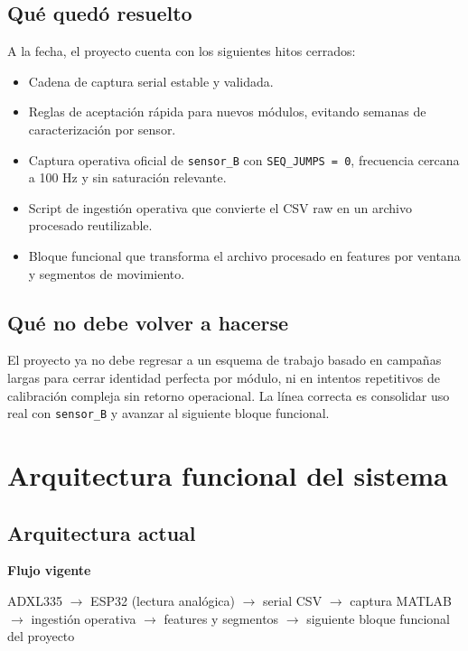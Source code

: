 \documentclass[11pt,a4paper]{article}
\begin{document}
\subsection{Qué quedó resuelto}

A la fecha, el proyecto cuenta con los siguientes hitos cerrados:

\begin{itemize}
  \item Cadena de captura serial estable y validada.
  \item Reglas de aceptación rápida para nuevos módulos, evitando semanas de caracterización por sensor.
  \item Captura operativa oficial de \texttt{sensor\_B} con \texttt{SEQ\_JUMPS = 0}, frecuencia cercana a 100 Hz y sin saturación relevante.
  \item Script de ingestión operativa que convierte el CSV raw en un archivo procesado reutilizable.
  \item Bloque funcional que transforma el archivo procesado en features por ventana y segmentos de movimiento.
\end{itemize}

\subsection{Qué no debe volver a hacerse}

El proyecto ya no debe regresar a un esquema de trabajo basado en campañas largas para cerrar identidad perfecta por módulo, ni en intentos repetitivos de calibración compleja sin retorno operacional. La línea correcta es consolidar uso real con \texttt{sensor\_B} y avanzar al siguiente bloque funcional.

\section{Arquitectura funcional del sistema}

\subsection{Arquitectura actual}

\begin{roadmapbox}
\textbf{Flujo vigente}\par
ADXL335 $\rightarrow$ ESP32 (lectura analógica) $\rightarrow$ serial CSV $\rightarrow$ captura MATLAB $\rightarrow$ ingestión operativa $\rightarrow$ features y segmentos $\rightarrow$ siguiente bloque funcional del proyecto
\end{roadmapbox}
\end{document}
